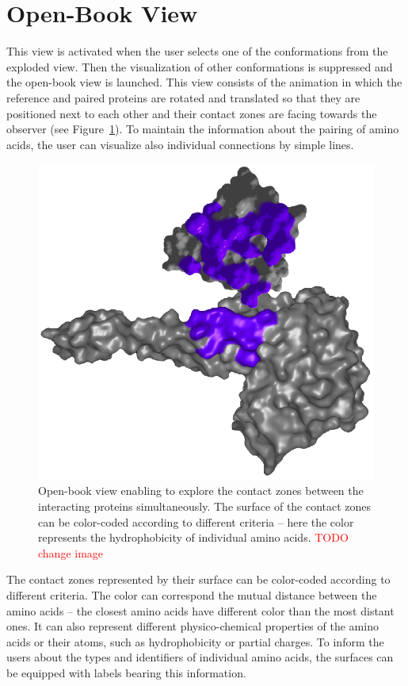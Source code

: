 \documentclass[journal]{vgtc}                %
\begin{document}
\section{Open-Book View}
This view is activated when the user selects one of the conformations from the exploded view. 
Then the visualization of other conformations is suppressed and the open-book view is launched.
This view consists of the animation in which the reference and paired proteins are rotated and translated so that they are positioned next to each other and their contact zones are facing towards the observer (see Figure~\ref{fig:book}). 
To maintain the information about the pairing of amino acids, the user can visualize also individual connections by simple lines.

\begin{figure}[bt]
  \centering
  \includegraphics[width=0.8\columnwidth]{book.png}
  \caption{Open-book view enabling to explore the contact zones between the interacting proteins simultaneously. The surface of the contact zones can be color-coded according to different criteria -- here the color represents the hydrophobicity of individual amino acids. \textcolor{red}{TODO change image}}
  \label{fig:book}
\end{figure}

The contact zones represented by their surface can be color-coded according to different criteria.
The color can correspond the mutual distance between the amino acids -- the closest amino acids have different color than the most distant ones.
It can also represent different physico-chemical properties of the amino acids or their atoms, such as hydrophobicity or partial charges.
To inform the users about the types and identifiers of individual amino acids, the surfaces can be equipped with labels bearing this information.
\end{document}
